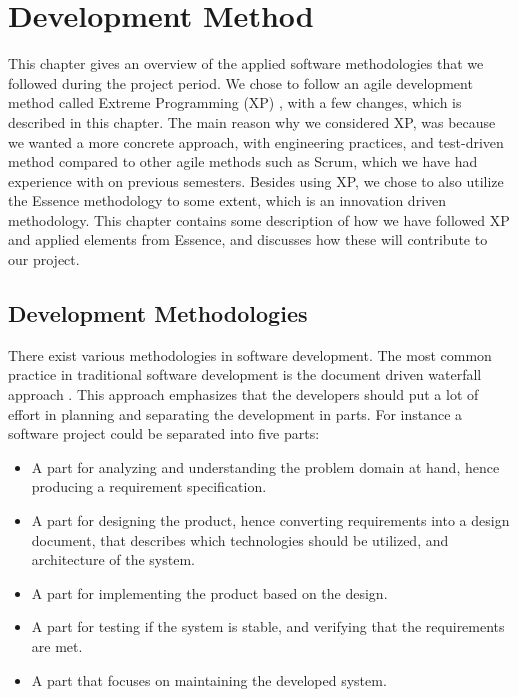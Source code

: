
\chapter{Development Method}
\label{cha:development_method}

This chapter gives an overview of the applied software methodologies that we followed during the project period. We chose to follow an agile development method called Extreme Programming (XP) \parencite{xp}, with a few changes, which is described in this chapter. The main reason why we considered XP, was because we wanted a more concrete approach, with engineering practices, and test-driven method compared to other agile methods such as Scrum, which we have had experience with on previous semesters. Besides using XP, we chose to also utilize the Essence methodology \parencite{essence_book} to some extent, which is an innovation driven methodology. This chapter contains some description of how we have followed XP and applied elements from Essence, and discusses how these will contribute to our project.

\section{Development Methodologies}
\label{sec:development_methodologies}
There exist various methodologies in software development. The most common practice in traditional software development is the document driven waterfall approach \parencite{waterfall}. This approach emphasizes that the developers should put a lot of effort in planning and separating the development in parts. For instance a software project could be separated into five parts:

\begin{itemize}
    \setlength\itemsep{-0.2em}
    \item A part for analyzing and understanding the problem domain at hand, hence producing a requirement specification. 
    \item A part for designing the product, hence converting requirements into a design document, that describes which technologies should be utilized,  and architecture of the system. 
    \item A part for implementing the product based on the design.
    \item A part for testing if the system is stable, and verifying that the requirements are met. 
    \item A part that focuses on maintaining the developed system. 
\end{itemize}

